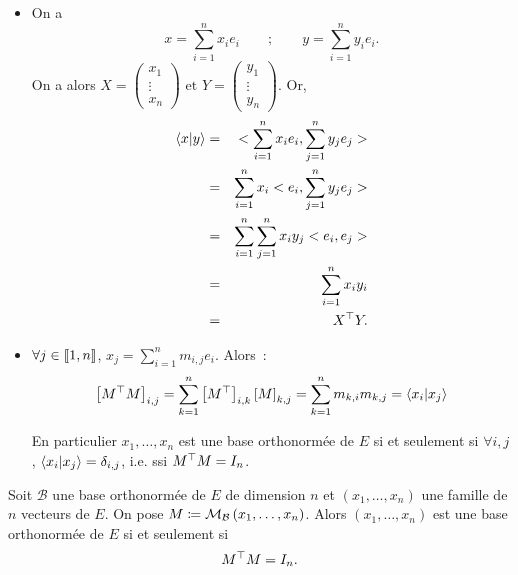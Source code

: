 \documentclass{magnolia}
\begin{document}
\begin{preuve}
\begin{itemize}
\item On a $$x=\sum_{i=1}^n x_i e_i \qquad ; \qquad y=\sum_{i=1}^n y_i e_i.$$
On a alors $X=\begin{pmatrix}x_1\\ \vdots \\ x_n \end{pmatrix} \text{ et } Y=\begin{pmatrix}y_1\\ \vdots \\ y_n \end{pmatrix}$.
Or, 
\begin{eqnarray*}\left\langle {x}\middle|{y}\right\rangle&=&<\sum_{i=1}^n x_i e_i,\sum_{j=1}^n y_j e_j > \\
&=& \sum_{i=1}^n x_i< e_i,\sum_{j=1}^n y_j e_j >\\
&=& \sum_{i=1}^n\sum_{j=1}^n  x_i y_j< e_i, e_j >\\
&=& \sum_{i=1}^n  x_i y_i\\
&=& {X}^{\top}Y.
\end{eqnarray*}
\item $\forall j \in \left\llbracket 1,n\right\rrbracket$, $x_j=\sum_{i=1}^n m_{i,j}e_i$. Alors~:
  \[\left[{M}^{\top}M\right]_{i,j}=\sum_{k=1}^n \left[{M}^{\top}\right]_{i,k}\left[M\right]_{k,j}=\sum_{k=1}^n m_{k,i}m_{k,j}=\left\langle {x_i}\middle|{x_j}\right\rangle\]
  
  En particulier $x_1,\ldots,x_n$ est une base orthonormée de $E$ si et
  seulement si $\forall i,j$, $\left\langle {x_i}\middle|{x_j}\right\rangle=\delta_{i,j}$, i.e. ssi ${M}^{\top}M=I_n$.
\end{itemize}

\end{preuve}

\begin{proposition}
Soit $\mathcal{B}$ une base orthonormée de $E$ de dimension $n$ et $(x_1,\ldots,x_n)$
une famille de $n$ vecteurs de $E$. On pose $M\coloneqq\mathcal{M}_{\mathcal{B}}\left(x_1,\ldots,x_n\right)$. 
Alors $(x_1,\ldots,x_n)$
est une base orthonormée de $E$ si et seulement si
\[{M}^{\top}M=I_n.\]
\end{proposition}

\end{document}
